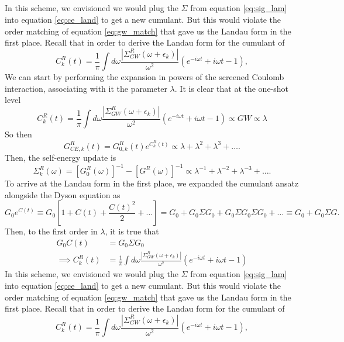 \subsection{}
In this scheme, we envisioned we would plug the $\Sigma$ from equation \eqref{eq:sig_lam} into equation \eqref{eq:ce_land} to get a new cumulant. But this would violate the order matching of equation \eqref{eq:gw_match} that gave us the Landau form in the first place.
Recall that in order to derive the Landau form for the cumulant of
\begin{equation}
    C_{k}^R(t) = \frac{1}{\pi}\int d\omega \frac{|\Sigma_{GW}^R(\omega+\epsilon_k)|}{\omega^2} \left( e^{-i\omega t} + i\omega t - 1 \right),
\end{equation}
We can start by  performing the expansion in powers of the screened Coulomb interaction, associating with it the parameter $\lambda$. It is clear that at the one-shot level 
\begin{equation}
    C_{k}^R(t) = \frac{1}{\pi}\int d\omega \frac{|\Sigma_{GW}^R(\omega+\epsilon_k)|}{\omega^2} \left( e^{-i\omega t} + i\omega t - 1 \right) \propto GW \propto \lambda
\end{equation}
So then
\begin{equation}
     G^{R}_{CE,k}(t) = G_{0,k}^R(t) e^{C_{k}^{R}(t)} \propto \lambda + \lambda^2 + \lambda^3 + \ldots.
\end{equation}
Then, the self-energy update is 
\begin{equation}
    \Sigma^R_k(\omega ) = \left[G_0^R(\omega )\right]^{-1} - \left[G^R(\omega )\right]^{-1} \propto \lambda^{-1} + \lambda^{-2} + \lambda^{-3} + \ldots.
\end{equation}
To arrive at the Landau form in the first place, we expanded the cumulant ansatz alongside the Dyson equation as 
\begin{equation}
    G_0 e^{C(t)} \equiv G_0 [ 1 + C(t) + \frac{C(t)^2}{2} + \ldots ] = G_0 + G_0 \Sigma G_0 + G_0 \Sigma G_0 \Sigma G_0 + \ldots \equiv G_0 + G_0 \Sigma G.
\end{equation}
Then, to the first order in $\lambda$, it is true that 
\begin{align}
    G_0 C(t) &= G_0 \Sigma G_0\\%
\implies C_{k}^R(t) &= \frac{1}{\pi}\int d\omega \frac{|\Sigma_{GW}^R(\omega+\epsilon_k)|}{\omega^2} \left( e^{-i\omega t} + i\omega t - 1 \right)
\end{align}
In this scheme, we envisioned we would plug the $\Sigma$ from equation \eqref{eq:sig_lam} into equation \eqref{eq:ce_land} to get a new cumulant. But this would violate the order matching of equation \eqref{eq:gw_match} that gave us the Landau form in the first place.
Recall that in order to derive the Landau form for the cumulant of
\begin{equation}
    C_{k}^R(t) = \frac{1}{\pi}\int d\omega \frac{|\Sigma_{GW}^R(\omega+\epsilon_k)|}{\omega^2} \left( e^{-i\omega t} + i\omega t - 1 \right),
\end{equation}

